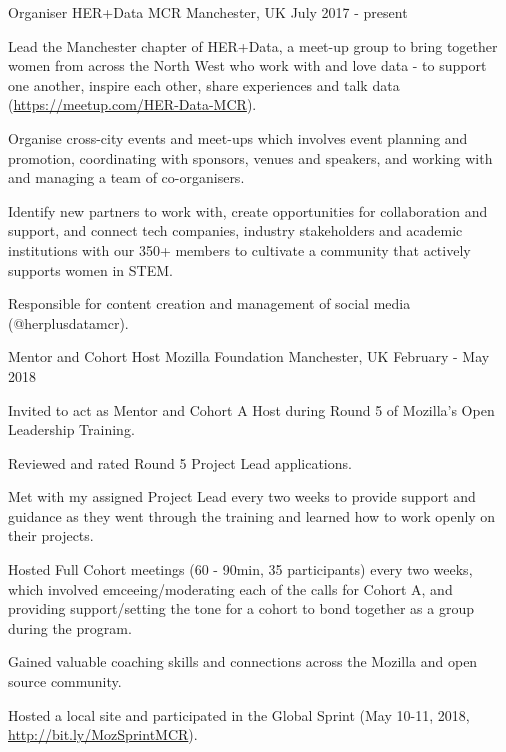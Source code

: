 \begin{cventries}
\cventry
    {Organiser}
    {HER+Data MCR}
    {Manchester, UK}
    {July 2017 - present}
    {
      \begin{cvitems}
        \item {Lead the Manchester chapter of HER+Data, a meet-up group to bring together women from across the North West who work with and love data - to support one another, inspire each other, share experiences and talk data (\url{https://meetup.com/HER-Data-MCR}).}
        \item {Organise cross-city events and meet-ups which involves event planning and promotion, coordinating with sponsors, venues and speakers, and working with and managing a team of co-organisers.}
        \item {Identify new partners to work with, create opportunities for collaboration and support, and connect tech companies, industry stakeholders and academic institutions with our 350+ members to cultivate a community that actively supports women in STEM.}
        \item {Responsible for content creation and management of social media (@herplusdatamcr).}
      \end{cvitems}
    }
\cventry
    {Mentor and Cohort Host}
    {Mozilla Foundation}
    {Manchester, UK}
    {February - May 2018}
    {
      \begin{cvitems}
        \item{Invited to act as Mentor and Cohort A Host during Round 5 of Mozilla's Open Leadership Training.}
        \item{Reviewed and rated Round 5 Project Lead applications.}
        \item{Met with my assigned Project Lead every two weeks to provide support and guidance as they went through the training and learned how to work openly on their projects.}
        \item{Hosted Full Cohort meetings (60 - 90min, 35 participants) every two weeks, which involved emceeing/moderating each of the calls for Cohort A, and providing support/setting the tone for a cohort to bond together as a group during the program.}
        \item{Gained valuable coaching skills and connections across the Mozilla and open source community.}
        \item{Hosted a local site and participated in the Global Sprint (May 10-11, 2018, \url{http://bit.ly/MozSprintMCR}).}
      \end{cvitems}
}
\end{cventries}
